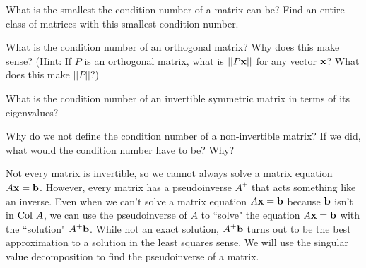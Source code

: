 \begin{activity} \hfill
	\ba
	\item What is the smallest the condition number of a matrix can be? Find an entire class of matrices with this smallest condition number.
	
	

	\item What is the condition number of an orthogonal matrix? Why does this make sense? (Hint: If $P$ is an orthogonal matrix, what is $||P \mathbf{x}||$ for any vector $\mathbf{x}$? What does this make $||P||$?)
	
	
	
	\item What is the condition number of an invertible symmetric matrix in terms of its eigenvalues?
	
	
	
	\item Why do we not define the condition number of a non-invertible matrix? If we did, what would the condition number have to be? Why?
	
	
	
	\ea
\end{activity}



Not every matrix is invertible, so we cannot always solve a matrix equation $A \mathbf{x} = \mathbf{b}$. However, every matrix has a pseudoinverse $A^+$ that acts something like an inverse. Even when we can't solve a matrix equation $A \mathbf{x} = \mathbf{b}$ because $\mathbf{b}$ isn't in $\text{Col } A$, we can use the pseudoinverse of $A$ to ``solve" the equation $A \mathbf{x} = \mathbf{b}$ with the ``solution" $A^+ \mathbf{b}$. While not an exact solution, $A^+ \mathbf{b}$ turns out to be the best approximation to a solution in the least squares sense. We will use the singular value decomposition to find the pseudoinverse of a matrix.



